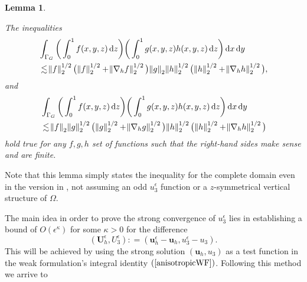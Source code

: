 \documentclass[12pt]{report}
\numberwithin{theorem}{chapter}
\numberwithin{corollary}{chapter}
\newtheorem{lemma}{Lemma}
\numberwithin{lemma}{chapter}
\numberwithin{remark}{chapter}
\numberwithin{definition}{chapter}
\numberwithin{prop}{chapter}
\newcommand*\diff{\mathop{}\!\mathrm{d}}
\begin{document}
\begin{lemma}\label{LadyzhenskayatypeIEQ}

  The inequalities
%
  \begin{equation}\nonumber
    \begin{split}
      & \int_{\Gamma_G} \bigg ( \int_0^1 f(x,y,z) \diff z \bigg) \bigg ( \int_0^1 g(x,y,z) h(x,y,z) \diff z \bigg ) \diff x \diff y \\
      & \lesssim \norm{f}_2^{1/2} \big ( \norm{f}_2^{1/2} + \norm{\nabla_h f}_2^{1/2} \big ) \norm{g}_2 \norm{h}_2^{1/2} \big (\norm{h}_2^{1/2} + \norm{\nabla_h h}_2^{1/2} \big ),
    \end{split}
  \end{equation}
%
  and
%
  \begin{equation}\nonumber
    \begin{split}
      & \int_{\Gamma_G} \bigg ( \int_0^1 f(x,y,z) \diff z \bigg) \bigg ( \int_0^1 g(x,y,z) h(x,y,z) \diff z \bigg ) \diff x \diff y \\
      & \lesssim \norm{f}_2 \norm{g}_2^{1/2} \big ( \norm{g}_2^{1/2} + \norm{\nabla_h g}_2^{1/2} \big ) \norm{h}_2^{1/2} \big (\norm{h}_2^{1/2} + \norm{\nabla_h h}_2^{1/2} \big )
    \end{split}
  \end{equation}
%
hold true for any $f,g,h$ set of functions such that the right-hand sides make sense and are finite.

\end{lemma}

Note that this lemma simply states the inequality for the complete domain even in the version in \cite{li2019primitive}, not assuming an odd $u_3^\epsilon$ function or a $z$-symmetrical vertical structure of $\Omega$.
  
The main idea in order to prove the strong convergence of $u^\epsilon_3$ lies in establishing a bound of $O(\epsilon^\kappa)$ for some $\kappa>0$ for the difference \begin{equation}\label{velocitydifferencefunctions}(\mathbf{U}_h^\epsilon, U_3^\epsilon): = (\mathbf{u}_h^\epsilon - \mathbf{u}_h, u_3^\epsilon - u_3).\end{equation} This will be achieved by using the strong solution $(\mathbf{u}_h,u_3)$ as a test function in the weak formulation's integral identity $(\ref{anisotropicWF})$. Following this method we arrive to
\end{document}
